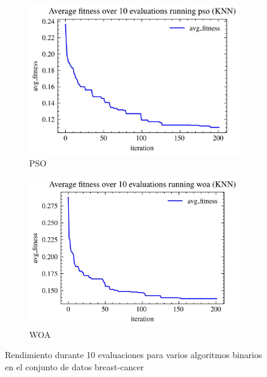 \begin{figure}[H]
\begin{subfigure}[b]{0.3\textwidth}
        \includegraphics[width=\textwidth]{imagenes/binary_knn_fitness/KNN_fitness_over_10_evaluations_pso_binary_breast-cancer.jpg}
        \caption{PSO}
        \label{fig:sub12}
    \end{subfigure}
    
    \begin{subfigure}[b]{0.3\textwidth}
        \centering
        \includegraphics[width=\textwidth]{imagenes/binary_knn_fitness/KNN_fitness_over_10_evaluations_woa_binary_breast-cancer.jpg}
        \caption{WOA}
        \label{fig:sub13}
    \end{subfigure}

    \caption{Rendimiento durante 10 evaluaciones para varios algoritmos binarios en el conjunto de datos breast-cancer}
    \label{fig:all}
\end{figure}


